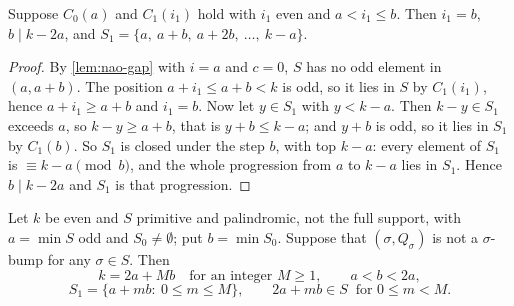 \begin{lemma}
\label{lem:nao-endband}
Suppose $C_0(a)$ and $C_1(i_1)$ hold with $i_1$ even and $a<i_1\le b$.
Then $i_1=b$, $b\mid k-2a$, and
$S_1=\{a,\ a+b,\ a+2b,\ \dots,\ k-a\}$.
\end{lemma}

\begin{proof}
By \autoref{lem:nao-gap} with $i=a$ and $c=0$, $S$ has no odd element in
$(a,a+b)$. The position $a+i_1\le a+b<k$ is odd, so it lies in $S$ by
$C_1(i_1)$, hence $a+i_1\ge a+b$ and $i_1=b$. Now let $y\in S_1$ with
$y<k-a$. Then $k-y\in S_1$ exceeds $a$, so $k-y\ge a+b$, that is
$y+b\le k-a$; and $y+b$ is odd, so it lies in $S_1$ by $C_1(b)$.
So $S_1$ is closed under the step $b$, with top $k-a$: every element of
$S_1$ is $\equiv k-a\pmod b$, and the whole progression from $a$ to $k-a$
lies in $S_1$. Hence $b\mid k-2a$ and $S_1$ is that progression.
\end{proof}

\begin{theorem}
\label{thm:nao-struct}
Let $k$ be even and $S$ primitive and palindromic, not the full support,
with $a=\min S$ odd and $S_0\ne\emptyset$; put $b=\min S_0$. Suppose that
$(\sigma,Q_\sigma)$ is not a $\sigma$-bump for any $\sigma\in S$. Then
\[
k=2a+Mb\quad\text{for an integer } M\ge1,\qquad a<b<2a,
\]
\[
S_1=\{a+mb:\ 0\le m\le M\},\qquad
2a+mb\in S\ \text{ for } 0\le m<M .
\]
\end{theorem}

